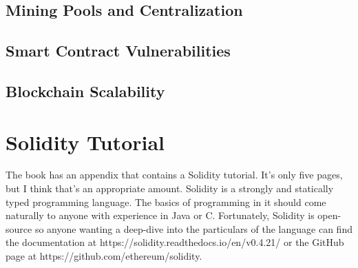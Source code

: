 \documentclass{article}
\begin{document}
\subsection{Mining Pools and Centralization}

\subsection{Smart Contract Vulnerabilities}

\subsection{Blockchain Scalability}

\section{Solidity Tutorial}
The book has an appendix that contains a Solidity tutorial. It's only five pages, but I think that's an appropriate amount. Solidity is a strongly and statically typed programming language. The basics of programming in it should come naturally to anyone with experience in Java or C. Fortunately, Solidity is open-source so
anyone wanting a deep-dive into the particulars of the language can find the documentation at https://solidity.readthedocs.io/en/v0.4.21/ or the GitHub page at https://github.com/ethereum/solidity.
\end{document}
